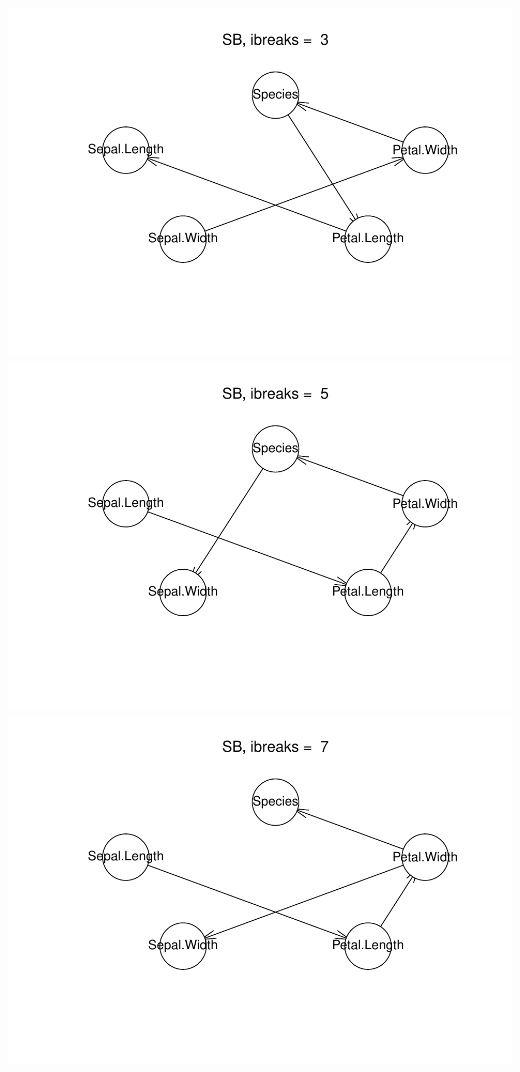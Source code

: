\documentclass[]{article}
\begin{document}
\includegraphics{BN_Ass2_files/figure-latex/unnamed-chunk-2-1.pdf}
\includegraphics{BN_Ass2_files/figure-latex/unnamed-chunk-2-2.pdf}
\includegraphics{BN_Ass2_files/figure-latex/unnamed-chunk-2-3.pdf}
\end{document}

